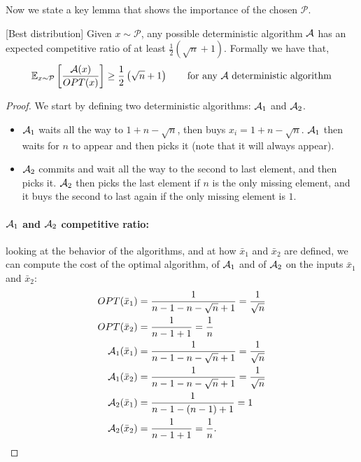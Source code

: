 \documentclass[11pt]{article}
\begin{document}
\begin{enumerate}
    Now we state a key lemma that shows the importance of the chosen $\mathcal{P}$. 
    \begin{lemma}\label{lem1}[Best distribution] Given $x\sim \mathcal{P}$, any possible deterministic algorithm $\mathcal{A}$ has an expected competitive ratio of at least $\frac{1}{2}\left(\sqrt{n} + 1\right)$. Formally we have that,
    \begin{equation*}
        \mathbb{E}_{x \sim \mathcal{P}}\left[\frac{\mathcal{A}(x)}{OPT(x)}\right] \geq \frac{1}{2}\left(\sqrt{n} + 1\right)\qquad \text{for any $\mathcal{A}$ deterministic algorithm}
    \end{equation*}
    \end{lemma}
    \begin{proof}
        We start by defining two deterministic algorithms: $\mathcal{A}_1$ and $\mathcal{A}_2$. 
        \begin{itemize}
            \item $\mathcal{A}_1$ waits all the way to $1 + n - \sqrt{n}$, then buys $x_i = 1 + n - \sqrt{n}$. $\mathcal{A}_1$ then waits for $n$ to appear and then picks it (note that it will always appear). \item $\mathcal{A}_2$ commits and wait all the way to the second to last element, and then picks it. $\mathcal{A}_2$ then picks the last element if $n$ is the only missing element, and it buys the second to last again if the only missing element is $1$. 
        \end{itemize}
        \paragraph*{$\mathcal{A}_1$ and $\mathcal{A}_2$ competitive ratio:}
        looking at the behavior of the algorithms, and at how $\bar x_1$ and $\bar x_2$ are defined, we can compute the cost of the optimal algorithm, of $\mathcal{A}_1$ and of $\mathcal{A}_2$ on the inputs $\bar x_1$ and $\bar x_2$:
    \begin{align*}
        OPT(\bar x_1) &=\frac{1}{n - 1 - n - \sqrt{n} + 1}  = \frac{1}{\sqrt{n}}\\
        OPT(\bar x_2) &= \frac{1}{n - 1 + 1}= \frac{1}{n}\\
        \mathcal{A}_1(\bar x_1) &=\frac{1}{n - 1 - n - \sqrt{n} + 1}  = \frac{1}{\sqrt{n}}\\
        \mathcal{A}_1(\bar x_2) &= \frac{1}{n - 1 - n - \sqrt{n} + 1} = \frac{1}{\sqrt{n}}\\
        \mathcal{A}_2(\bar x_1) &= \frac{1}{n - 1 - (n - 1) + 1} = 1\\
        \mathcal{A}_2(\bar x_2) &=\frac{1}{n - 1 + 1}= \frac{1}{n}.
    \end{align*}


\end{proof}
\end{enumerate}
\end{document}
